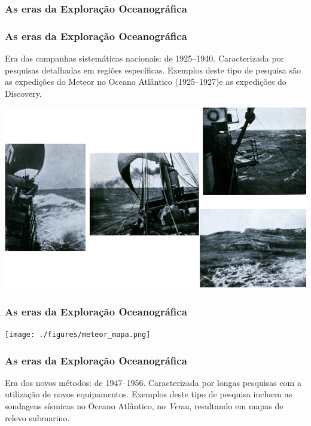 \begin{frame}
    \frametitle{As eras da Exploração Oceanográfica}
    \centerline{}
\end{frame}

\begin{frame}
    \frametitle{As eras da Exploração Oceanográfica}
    \small{Era das campanhas sistemáticas nacionais: de 1925--1940.
    Caracterizada por pesquisas detalhadas em regiões específicas.  Exemplos
    deste tipo de pesquisa são as expedições do Meteor no Oceano Atlântico
    (1925--1927)e as expedições do Discovery.}
    \centerline{\includegraphics[scale=0.35]{./figures/meteor.png}}
\end{frame}

\begin{frame}
    \frametitle{As eras da Exploração Oceanográfica}
    \centerline{\texttt{[image: ./figures/meteor\_mapa.png]}}
\end{frame}

\begin{frame}
    \frametitle{As eras da Exploração Oceanográfica}
    Era dos novos métodos: de 1947--1956.  Caracterizada por longas pesquisas
    com a utilização de novos equipamentos.  Exemplos deste tipo de pesquisa
    incluem as sondagens sísmicas no Oceano Atlântico, no {\it Vema},
    resultando em mapas de relevo submarino.
\end{frame}

